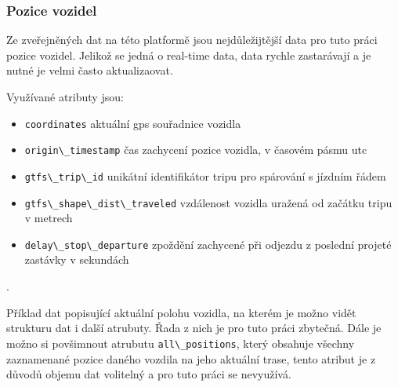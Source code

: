 \subsubsection{Pozice vozidel}

Ze zveřejněných dat na této platformě jsou nejdůležijtější data pro tuto práci pozice vozidel. Jelikož se jedná o real-time data, data rychle zastarávají a je nutné je velmi často aktualizaovat.

\bigbreak

Využívané atributy jsou:

\begin{itemize}
	\item \verb-coordinates- aktuální \gls{gps} souřadnice vozidla

	\item \verb-origin\_timestamp- čas zachycení pozice vozidla, v časovém pásmu \gls{utc}

	\item \verb-gtfs\_trip\_id- unikátní identifikátor tripu pro spárování s jízdním řádem

	\item \verb-gtfs\_shape\_dist\_traveled- vzdálenost vozidla uražená od začátku tripu v metrech

	\item \verb-delay\_stop\_departure- zpoždění zachycené při odjezdu z poslední projeté zastávky v sekundách
\end{itemize}.

Příklad dat popisující aktuální polohu vozidla, na kterém je možno vidět strukturu dat i další atrubuty. Řada z nich je pro tuto práci zbytečná. Dále je možno si povšimnout atrubutu \verb-all\_positions-, který obsahuje všechny zaznamenané pozice daného vozdila na jeho aktuální trase, tento atribut je z důvodů objemu dat volitelný a pro tuto práci se nevyužívá.

